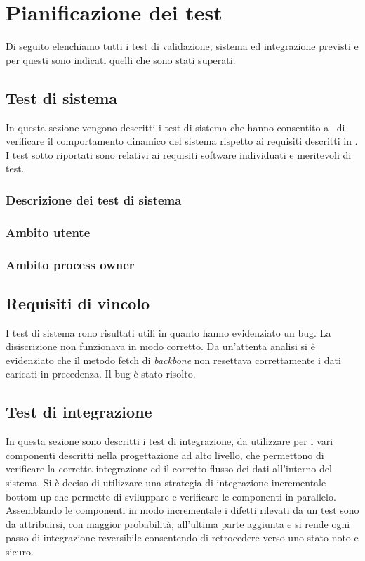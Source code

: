 \section{Pianificazione dei test}
Di seguito elenchiamo tutti i test di validazione, sistema ed integrazione previsti e per questi sono indicati quelli che sono stati superati. 
\subsection{Test di sistema}
In questa sezione vengono descritti i test di sistema che hanno consentito a \gruppo ~di verificare il comportamento dinamico del sistema rispetto ai requisiti descritti in \infoAR. I test sotto riportati sono relativi ai requisiti software individuati e meritevoli di test.
\subsubsection{Descrizione dei test di sistema}
\subsubsection{Ambito utente}
\subsubsection{Ambito process owner}
\subsection{Requisiti di vincolo}
I test di sistema rono risultati utili in quanto hanno evidenziato un bug. La disiscrizione non funzionava in modo corretto. Da un'attenta analisi si è evidenziato che il metodo fetch di \textit{backbone} non resettava correttamente i dati caricati in precedenza. Il bug è stato risolto.
\subsection{Test di integrazione}
In questa sezione sono descritti i test di integrazione, da utilizzare per i vari componenti descritti nella progettazione ad alto livello, che permettono di verificare la corretta integrazione ed il corretto flusso dei dati all'interno del sistema.
Si è deciso di utilizzare una strategia di integrazione incrementale bottom-up che permette di sviluppare e verificare le componenti in parallelo.\\
Assemblando le componenti in modo incrementale i difetti rilevati da un test sono da
attribuirsi, con maggior probabilità, all'ultima parte aggiunta e si rende ogni passo di
integrazione reversibile consentendo di retrocedere verso uno stato noto e sicuro.
